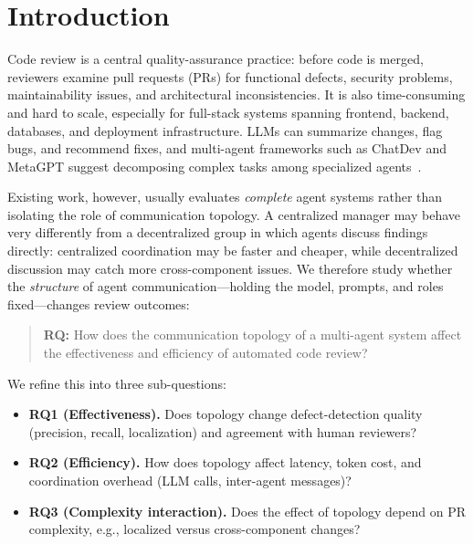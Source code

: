\documentclass[conference]{IEEEtran}
\begin{document}
\section{Introduction}
Code review is a central quality-assurance practice: before code is merged,
reviewers examine pull requests (PRs) for functional defects, security problems,
maintainability issues, and architectural inconsistencies. It is also
time-consuming and hard to scale, especially for full-stack systems spanning
frontend, backend, databases, and deployment infrastructure. LLMs can summarize
changes, flag bugs, and recommend fixes, and multi-agent frameworks such as
ChatDev and MetaGPT suggest decomposing complex tasks among specialized
agents~\cite{chatdev,metagpt}.

Existing work, however, usually evaluates \emph{complete} agent systems rather than
isolating the role of communication topology. A centralized manager may behave
very differently from a decentralized group in which agents discuss findings
directly: centralized coordination may be faster and cheaper, while decentralized
discussion may catch more cross-component issues. We therefore study whether the
\emph{structure} of agent communication---holding the model, prompts, and roles
fixed---changes review outcomes:

\begin{quote}
\textbf{RQ:} How does the communication topology of a multi-agent system affect the
effectiveness and efficiency of automated code review?
\end{quote}
We refine this into three sub-questions:
\begin{itemize}
  \item \textbf{RQ1 (Effectiveness).} Does topology change defect-detection
  quality (precision, recall, localization) and agreement with human reviewers?
  \item \textbf{RQ2 (Efficiency).} How does topology affect latency, token cost,
  and coordination overhead (LLM calls, inter-agent messages)?
  \item \textbf{RQ3 (Complexity interaction).} Does the effect of topology depend
  on PR complexity, e.g., localized versus cross-component changes?
\end{itemize}
\end{document}
